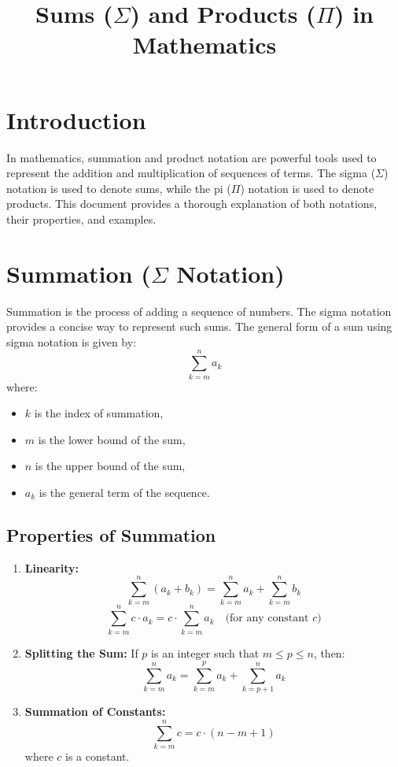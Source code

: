 \documentclass{article}
\title{Sums (\(\Sigma\)) and Products (\(\Pi\)) in Mathematics}
\author{}
\date{}
\begin{document}
\maketitle

\section*{Introduction}
In mathematics, summation and product notation are powerful tools used to represent the addition and multiplication of sequences of terms. The sigma (\(\Sigma\)) notation is used to denote sums, while the pi (\(\Pi\)) notation is used to denote products. This document provides a thorough explanation of both notations, their properties, and examples.

\section{Summation (\(\Sigma\) Notation)}
Summation is the process of adding a sequence of numbers. The sigma notation provides a concise way to represent such sums. The general form of a sum using sigma notation is given by:
\[
\sum_{k = m}^{n} a_k
\]
where:
\begin{itemize}
    \item \(k\) is the index of summation,
    \item \(m\) is the lower bound of the sum,
    \item \(n\) is the upper bound of the sum,
    \item \(a_k\) is the general term of the sequence.
\end{itemize}

\subsection{Properties of Summation}
\begin{enumerate}
    \item \textbf{Linearity:}
    \[
    \sum_{k=m}^{n} (a_k + b_k) = \sum_{k=m}^{n} a_k + \sum_{k=m}^{n} b_k
    \]
    \[
    \sum_{k=m}^{n} c \cdot a_k = c \cdot \sum_{k=m}^{n} a_k \quad \text{(for any constant } c\text{)}
    \]
    
    \item \textbf{Splitting the Sum:}
    If \(p\) is an integer such that \(m \leq p \leq n\), then:
    \[
    \sum_{k=m}^{n} a_k = \sum_{k=m}^{p} a_k + \sum_{k=p+1}^{n} a_k
    \]

    \item \textbf{Summation of Constants:}
    \[
    \sum_{k=m}^{n} c = c \cdot (n - m + 1)
    \]
    where \(c\) is a constant.
\end{enumerate}
\end{document}
